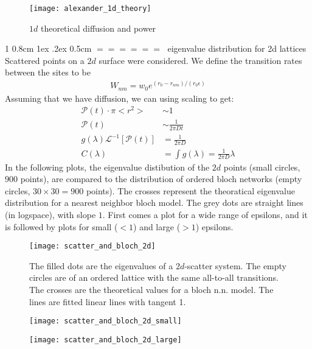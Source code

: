 \documentclass[onecolumn,fleqn,notitlepage,secnumarabic]{revtex4}
\makeatletter
\def\section{%
  \@startsection
    {section}%
    {1}%
    {\z@}%
    {0.8cm \@plus1ex \@minus .2ex}%
    {0.5cm}%
    {\Large\bf $=\!=\!=\!=\!=\!=\;$}%
}%
\renewcommand{\includegraphics}[2][]{\ \\ \ FIGURE: \ \\ \ }
\makeatother
\begin{document}
\begin{figure}[H]
\texttt{[image: alexander\_1d\_theory]}
\caption{$1d$ theoretical diffusion and power}
\end{figure}

\section{eigenvalue distribution for 2d lattices}
Scattered points on a $2d$ surface were considered. We define the transition rates between the sites to be 
\begin{align}   W_{nm} = w_0 e^{(r_0 - r_{nm})/(r_0\epsilon)} \end{align}  
Assuming that we have diffusion, we can using scaling to get:
\begin{align} 
    \mathcal{P}(t) \cdot \pi <r^2> &\sim 1 \\
    \mathcal{P}(t) &\sim \frac{1}{2\pi Dt}\\
    g(\lambda)\mathcal{L}^{-1}\left[\mathcal{P}(t)\right]&= \frac{1}{2\pi D} \\
    C(\lambda) &= \int g(\lambda) = \frac{1}{2\pi D}\lambda
\end{align}
In the following plots, the eigenvalue distibution of the $2d$ points (small circles, $900$ points), are compared to the distribution of ordered bloch networks (empty circles, $30\times30=900$ points). The crosses represent the theoratical eigenvalue distribution for a nearest neighbor bloch model. The grey dots are straight lines (in logspace), with slope $1$. First comes a plot for a wide range of epsilons, and it is followed by plots for small ($<1$) and large ($>1$) epsilons.

\begin{figure}[H]
\texttt{[image: scatter\_and\_bloch\_2d]}
\caption{The filled dots are the eigenvalues of a $2d$-scatter system. The empty circles are of an ordered lattice with the same all-to-all transitions. The crosses are the theoretical values for a bloch n.n. model. The lines are fitted linear lines with tangent 1.}
\end{figure}
\begin{figure}[H]
\texttt{[image: scatter\_and\_bloch\_2d\_small]}
\caption{}
\end{figure}
\begin{figure}[H]
\texttt{[image: scatter\_and\_bloch\_2d\_large]}
\end{figure}
\end{document}
